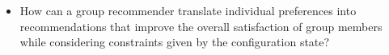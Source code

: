 \begin{itemize}
    \item How can a group recommender translate individual preferences into recommendations that improve the overall satisfaction of group members while considering constraints given by the configuration state? 
\end{itemize}








